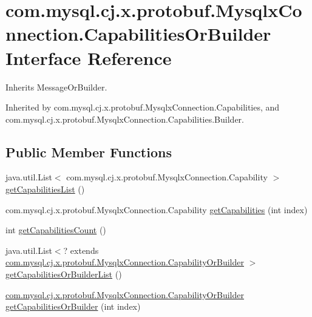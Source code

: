 \hypertarget{interfacecom_1_1mysql_1_1cj_1_1x_1_1protobuf_1_1_mysqlx_connection_1_1_capabilities_or_builder}{}\section{com.\+mysql.\+cj.\+x.\+protobuf.\+Mysqlx\+Connection.\+Capabilities\+Or\+Builder Interface Reference}
\label{interfacecom_1_1mysql_1_1cj_1_1x_1_1protobuf_1_1_mysqlx_connection_1_1_capabilities_or_builder}


Inherits Message\+Or\+Builder.



Inherited by com.\+mysql.\+cj.\+x.\+protobuf.\+Mysqlx\+Connection.\+Capabilities, and com.\+mysql.\+cj.\+x.\+protobuf.\+Mysqlx\+Connection.\+Capabilities.\+Builder.

\subsection*{Public Member Functions}
\begin{DoxyCompactItemize}
\item 
java.\+util.\+List$<$ com.\+mysql.\+cj.\+x.\+protobuf.\+Mysqlx\+Connection.\+Capability $>$ \mbox{\hyperlink{interfacecom_1_1mysql_1_1cj_1_1x_1_1protobuf_1_1_mysqlx_connection_1_1_capabilities_or_builder_a259059c95b00cff6f9b072bf0c581255}{get\+Capabilities\+List}} ()
\item 
com.\+mysql.\+cj.\+x.\+protobuf.\+Mysqlx\+Connection.\+Capability \mbox{\hyperlink{interfacecom_1_1mysql_1_1cj_1_1x_1_1protobuf_1_1_mysqlx_connection_1_1_capabilities_or_builder_af0ff90d0dde8126b53ab73fdf6b889a0}{get\+Capabilities}} (int index)
\item 
int \mbox{\hyperlink{interfacecom_1_1mysql_1_1cj_1_1x_1_1protobuf_1_1_mysqlx_connection_1_1_capabilities_or_builder_ae46f69b9a2cbb7db5786284aace0afa0}{get\+Capabilities\+Count}} ()
\item 
java.\+util.\+List$<$? extends \mbox{\hyperlink{interfacecom_1_1mysql_1_1cj_1_1x_1_1protobuf_1_1_mysqlx_connection_1_1_capability_or_builder}{com.\+mysql.\+cj.\+x.\+protobuf.\+Mysqlx\+Connection.\+Capability\+Or\+Builder}} $>$ \mbox{\hyperlink{interfacecom_1_1mysql_1_1cj_1_1x_1_1protobuf_1_1_mysqlx_connection_1_1_capabilities_or_builder_a86be66e7a1557c55d7fc3ccd6e6c1639}{get\+Capabilities\+Or\+Builder\+List}} ()
\item 
\mbox{\hyperlink{interfacecom_1_1mysql_1_1cj_1_1x_1_1protobuf_1_1_mysqlx_connection_1_1_capability_or_builder}{com.\+mysql.\+cj.\+x.\+protobuf.\+Mysqlx\+Connection.\+Capability\+Or\+Builder}} \mbox{\hyperlink{interfacecom_1_1mysql_1_1cj_1_1x_1_1protobuf_1_1_mysqlx_connection_1_1_capabilities_or_builder_a12a397c13fc8e3fc83b8b7accdcc7022}{get\+Capabilities\+Or\+Builder}} (int index)
\end{DoxyCompactItemize}


